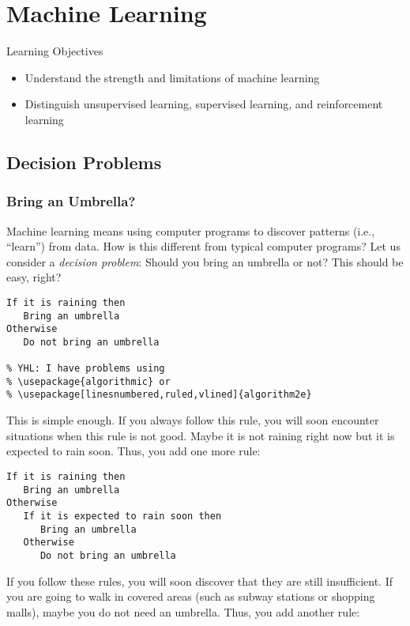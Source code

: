\chapter{Machine Learning}

Learning Objectives

\begin{itemize}
\item Understand the strength and limitations of machine learning
\item Distinguish  unsupervised learning,  supervised learning, and reinforcement learning
\end{itemize}

\section{Decision Problems}


\subsection{Bring an Umbrella?}

Machine learning means using computer programs to discover patterns
(i.e., ``learn'') from data. How is this different from typical
computer programs?  Let us consider a {\it decision problem}:
Should you bring an umbrella or not?  This should be easy, right?


\begin{verbatim}
If it is raining then
   Bring an umbrella
Otherwise
   Do not bring an umbrella

% YHL: I have problems using 
% \usepackage{algorithmic} or
% \usepackage[linesnumbered,ruled,vlined]{algorithm2e}
\end{verbatim}

This is simple enough.  If you always follow this rule, you will soon
encounter situations when this rule is not good.  Maybe it is not raining
right now but it is expected to rain soon. Thus, you add one more rule:

\begin{verbatim}
If it is raining then
   Bring an umbrella
Otherwise
   If it is expected to rain soon then
      Bring an umbrella
   Otherwise
      Do not bring an umbrella
\end{verbatim}

If you follow these rules, you will soon discover that they are still
insufficient.  If you are going to walk in covered areas (such as
subway stations or shopping malls), maybe you do not need an umbrella.
Thus, you add another rule:

